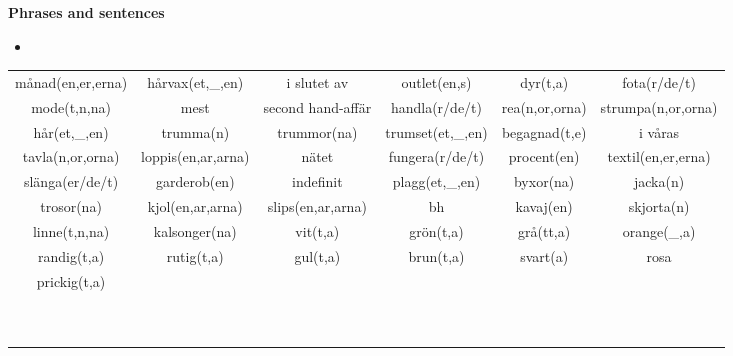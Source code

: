 
\begin{flushleft}
    \textbf{Phrases and sentences}
    \begin{itemize}
        \item 
    \end{itemize}
\end{flushleft}

\begin{center}
    \begin{adjustwidth}{-2cm}{}
        \begin{tabular}{|c c c c c c|}
            \hline
            månad(en,er,erna) & hårvax(et,\_,en) & i slutet av & outlet(en,s) & dyr(t,a) & fota(r/de/t) \\
            mode(t,n,na) & mest & second hand-affär & handla(r/de/t) & rea(n,or,orna) & strumpa(n,or,orna) \\
            hår(et,\_,en) & trumma(n) & trummor(na) & trumset(et,\_,en) & begagnad(t,e) & i våras \\
            tavla(n,or,orna) & loppis(en,ar,arna) & nätet & fungera(r/de/t) & procent(en) & textil(en,er,erna) \\
            slänga(er/de/t) & garderob(en) & indefinit & plagg(et,\_,en) & byxor(na) & jacka(n) \\
            trosor(na) & kjol(en,ar,arna) & slips(en,ar,arna) & bh & kavaj(en) & skjorta(n) \\
            linne(t,n,na) & kalsonger(na) & vit(t,a) & grön(t,a) & grå(tt,a) & orange(\_,a) \\
            randig(t,a) & rutig(t,a) & gul(t,a) & brun(t,a) & svart(a) & rosa \\
            prickig(t,a) &  &  &  &  &  \\
             &  &  &  &  &  \\
             &  &  &  &  &  \\
             &  &  &  &  &  \\
             &  &  &  &  &  \\
             &  &  &  &  &  \\
             &  &  &  &  &  \\
             &  &  &  &  &  \\
             &  &  &  &  &  \\
             &  &  &  &  &  \\
             &  &  &  &  &  \\

\end{tabular}
\end{adjustwidth}
\end{center}
